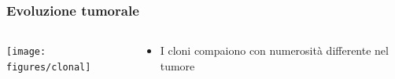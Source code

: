 \begin{frame}
	\frametitle{Evoluzione tumorale}
	\begin{columns}
		\begin{column}{0.75\textwidth}
			\centering
			\texttt{[image: figures/clonal]}
		\end{column}
		\begin{column}{0.25\textwidth}
			\begin{itemize}
				\item I cloni compaiono con numerosità differente nel tumore
			\end{itemize}
		\end{column}
	\end{columns}
\end{frame}


\def\mut#1#2{%
	\begin{scope}[shift={#1}]
		\node[thick,draw,fill=blue!70,circle, scale=3.5] (#2) {};
	\end{scope}
}

\def\muta#1#2{%
	\begin{scope}[shift={#1}]
		\mut{(0,0)}{#2};
		\draw[fill=white] (0,0) circle (.1);
	\end{scope}
}

\def\mutb#1#2{%
	\begin{scope}[shift={#1}]
		\muta{(0,0)}{#2};
		\node[fill,color=brown,star, star points=6,scale=0.75] at (45:0.3) {};
	\end{scope}
}

\def\mutc#1#2{%
	\begin{scope}[shift={#1}]
		\muta{(0,0)}{#2};
		\node[fill,color=green,regular polygon, regular polygon sides=3,scale=0.65] at (90:0.3) {};
	\end{scope}
}

\def\mutd#1#2{%
	\begin{scope}[shift={#1}]
		\mutc{(0,0)}{#2};
		\node[fill,color=red,regular polygon, regular polygon sides=4,scale=0.75] at (0:0.3) {};
	\end{scope}
}

\def\mute#1#2{%
	\begin{scope}[shift={#1}]
		\mutd{(0,0)}{#2};
		\node[draw,cross out, draw=pink, very thick,scale=.8] at (180:.3) {};
	\end{scope}
}

\def\mutf#1#2{%
	\begin{scope}[shift={#1}]
		\mutd{(0,0)}{#2};
		\node[draw,diamond,scale=0.6, fill,color=blue]  at (270:0.3) {};
	\end{scope}
}

